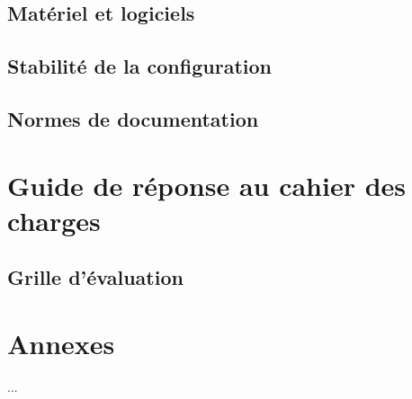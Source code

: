     \subsection{Matériel et logiciels}
    
    \subsection{Stabilité de la configuration}
    
    \subsection{Normes de documentation}

\section{Guide de réponse au cahier des charges}

    \subsection{Grille d'évaluation}

\section{Annexes}

    ...
